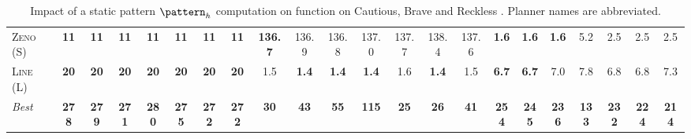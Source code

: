 \begin{table}[tb]
{\begin{tabular}{|l||ccccccc||ccccccc||ccccccc||}
\textsc{Zeno} (S)&\textbf{11}&\textbf{11}&\textbf{11}&\textbf{11}&\textbf{11}&\textbf{11}&\textbf{11}&\textbf{136.7}&136.9&136.8&137.0&137.7&138.4&137.6&\textbf{1.6}&\textbf{1.6}&\textbf{1.6}&5.2&2.5&2.5&2.5\\
\textsc{Line} (L)&\textbf{20}&\textbf{20}&\textbf{20}&\textbf{20}&\textbf{20}&\textbf{20}&\textbf{20}&1.5&\textbf{1.4}&\textbf{1.4}&\textbf{1.4}&1.6&\textbf{1.4}&1.5&\textbf{6.7}&\textbf{6.7}&7.0&7.8&6.8&6.8&7.3
\\\hline
\textit{Best}&\textbf{278}&\textbf{279}&\textbf{271}&\textbf{280}&\textbf{275}&\textbf{272}&\textbf{272}&\textbf{30}&\textbf{43}&\textbf{55}&\textbf{115}&\textbf{25}&\textbf{26}&\textbf{41}&\textbf{254}&\textbf{245}&\textbf{236}&\textbf{133}&\textbf{232}&\textbf{224}&\textbf{214}\\\hline

        \end{tabular}}
        \caption{Impact of a static pattern $\pattern_h$ computation on function on Cautious, Brave and Reckless \pattyd. Planner names are abbreviated.}
        \label{tab:abl-patternh-static}
        \end{table}
        